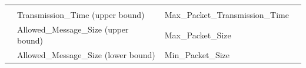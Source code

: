 \documentclass[11pt]{book}
\begin{document}
{\begin{tabular}{|c|p{5cm}|p{5cm}|c|}
\multicolumn{1}{|c|}{} \\   \cline {2-3}
\multicolumn{1}{|c|}{} &
\multicolumn{1}{|p{4cm}|}{Transmission\_Time (upper bound)}                             &   
\multicolumn{1}{|p{4cm}|}{Max\_Packet\_Transmission\_Time}                                         &   
\multicolumn{1}{|c|}{} \\   \cline {2-3}
\multicolumn{1}{|c|}{} &
\multicolumn{1}{|p{4cm}|}{Allowed\_Message\_Size (upper bound)}                             &   
\multicolumn{1}{|p{4cm}|}{Max\_Packet\_Size}                                         &   
\multicolumn{1}{|c|}{} \\   \cline {2-3}
\multicolumn{1}{|c|}{} &
\multicolumn{1}{|p{4cm}|}{Allowed\_Message\_Size (lower bound)}                             &   
\multicolumn{1}{|p{4cm}|}{Min\_Packet\_Size}                                         &   
\multicolumn{1}{|c|}{} \\   \cline {2-4}
\hline 
\end{tabular}
}

\newpage
\end{document}

